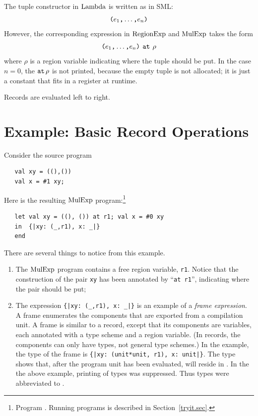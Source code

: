 \documentclass[12pt]{book}
\begin{document}
The tuple constructor in $\hbox{\rm Lambda}$ is written as in SML:
$$\hbox{\tt (}e_1\hbox{\tt ,}\ldots\hbox{\tt ,}e_n\hbox{\tt )}$$
However, the corresponding expression in $\hbox{\rm RegionExp}$ and $\hbox{\rm MulExp}$ takes the form
$$\hbox{\tt (}e_1\hbox{\tt ,}\ldots\hbox{\tt ,}e_n\hbox{\tt )}\,\mathbin{\hbox{\tt at}}\,\rho$$
%
where $\rho$ is a 
%
region variable indicating where the tuple should be put.  In the case
$n=0$, the $\mathbin{\hbox{\tt at}}\,\rho$ is not printed, because the empty tuple is not
allocated; it is just a constant that fits in a 
%
register at runtime.

Records are evaluated left to right.

\section{Example: Basic Record Operations}
\label{proj.ex}
Consider the source program
\begin{verbatim}
   val xy = ((),()) 
   val x = #1 xy;
\end{verbatim}
Here is the resulting $\hbox{\rm MulExp}$ program:\footnote{Program
  . Running programs is described in
  Section~\ref{tryit.sec}.}
\begin{verbatim}
   let val xy = ((), ()) at r1; val x = #0 xy
   in  {|xy: (_,r1), x: _|}
   end 
\end{verbatim}
There are several things to notice from this example. 
\begin{enumerate}
\item The $\hbox{\rm MulExp}$ program contains a free region variable, {\tt r1}.
  Notice that the construction of the pair {\tt xy} has been annotated
  by ``{\tt at r1}'', indicating where the pair should be put;
\item The expression \verb+{|xy: (_,r1), x: _|}+ is an example of a
  {\em frame expression}. A frame enumerates the components that are
  exported from a compilation unit.  A frame is similar to a record,
  except that its components are variables, each annotated with a type
  scheme and a region variable. (In records, the components can only
  have types, not general type schemes.) In the example, the type of
  the frame is \verb+{|xy: (unit*unit, r1), x: unit|}+.
  The type shows that, after the program unit has been evaluated,
   will reside in .  In the the above example,
  printing of types was suppressed. Thus types were abbreviated to
  \boxml{\_}.
\end{enumerate}
\end{document}
